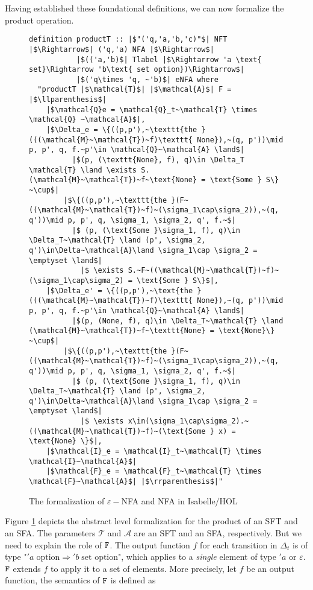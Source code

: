 \documentclass[a4paper,UKenglish,cleveref, autoref, anonymous, thm-restate]{lipics-v2021}
\begin{document}
Having established these foundational definitions, we can now formalize the product operation. 

\begin{figure}[hbt!]
	\begin{lstlisting}
definition productT :: |$"('q,'a,'b,'c)"$| NFT |$\Rightarrow$| ('q,'a) NFA |$\Rightarrow$| 
           |$(('a,'b)$| Tlabel |$\Rightarrow 'a \text{ set}\Rightarrow 'b\text{ set option})\Rightarrow$|
           |$('q\times 'q, ~'b)$| eNFA where
  "productT |$\mathcal{T}$| |$\mathcal{A}$| F = |$\llparenthesis$|
    |$\mathcal{Q}e = \mathcal{Q}_t~\mathcal{T} \times \mathcal{Q} ~\mathcal{A}$|,
    |$\Delta_e = \{((p,p'),~\texttt{the }(((\mathcal{M}~\mathcal{T})~f)\texttt{ None}),~(q, p'))\mid p, p', q, f.~p'\in \mathcal{Q}~\mathcal{A} \land$|
          |$(p, (\texttt{None}, f), q)\in \Delta_T \mathcal{T} \land \exists S. (\mathcal{M}~\mathcal{T})~f~\text{None} = \text{Some } S\} ~\cup$|
        |$\{((p,p'),~\texttt{the }(F~((\mathcal{M}~\mathcal{T})~f)~(\sigma_1\cap\sigma_2)),~(q, q'))\mid p, p', q, \sigma_1, \sigma_2, q', f.~$|
          |$ (p, (\text{Some }\sigma_1, f), q)\in \Delta_T~\mathcal{T} \land (p', \sigma_2, q')\in\Delta~\mathcal{A}\land \sigma_1\cap \sigma_2 = \emptyset \land$|
            |$ \exists S.~F~((\mathcal{M}~\mathcal{T})~f)~(\sigma_1\cap\sigma_2) = \text{Some } S\}$|,
    |$\Delta_e' = \{((p,p'),~\text{the }(((\mathcal{M}~\mathcal{T})~f)\texttt{ None}),~(q, p'))\mid p, p', q, f.~p'\in \mathcal{Q}~\mathcal{A} \land$|
          |$(p, (None, f), q)\in \Delta_T~\mathcal{T} \land (\mathcal{M}~\mathcal{T})~f~\texttt{None} = \text{None}\} ~\cup$|
        |$\{((p,p'),~\texttt{the }(F~((\mathcal{M}~\mathcal{T})~f)~(\sigma_1\cap\sigma_2)),~(q, q'))\mid p, p', q, \sigma_1, \sigma_2, q', f.~$|
          |$ (p, (\text{Some }\sigma_1, f), q)\in \Delta_T~\mathcal{T} \land (p', \sigma_2, q')\in\Delta~\mathcal{A}\land \sigma_1\cap \sigma_2 = \emptyset \land$|
            |$ \exists x\in(\sigma_1\cap\sigma_2).~((\mathcal{M}~\mathcal{T})~f)~(\text{Some } x) = \text{None} \}$|,
    |$\mathcal{I}_e = \mathcal{I}_t~\mathcal{T} \times \mathcal{I}~\mathcal{A}$|
    |$\mathcal{F}_e = \mathcal{F}_t~\mathcal{T} \times \mathcal{F}~\mathcal{A}$| |$\rrparenthesis$|"
	\end{lstlisting}
\caption{The formalization of $\varepsilon-$NFA and NFA in Isabelle/HOL}
\label{fig-def-FTProd}
\end{figure}

Figure \ref{fig-def-FTProd} depicts the abstract level formalization for the product of an SFT and an SFA. The parameters $\mathcal{T}$ and $\mathcal{A}$ are an SFT and an SFA, respectively. But we need to explain the role of $\text{\texttt{F}}$. The output function $f$ for each transition in $\Delta_t$ is of type "$'a\;\text{option} \Rightarrow 'b\;\text{set option}$", which applies to a \emph{single} element of type $'a$ or $\varepsilon$. $\text{\texttt{F}}$ extends $f$ to apply it to a set of elements. More precisely, let $f$ be an output function, the semantics of $\text{\texttt{F}}$ is defined as 
\end{document}
